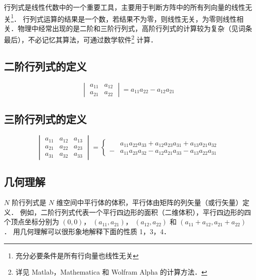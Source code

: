 

行列式是线性代数中的一个重要工具，主要用于判断方阵中的所有列向量的线性无关\footnote{充分必要条件是所有行向量也线性无关}．%
行列式运算的结果是一个数，若结果不为零，则线性无关，为零则线性相关．物理中经常出现的是二阶和三阶行列式，高阶行列式的计算较为复杂（见词条最后），不必记忆其算法，可通过数学软件\footnote{详见 Matlab，Mathematica 和 Wolfram Alpha 的计算方法．} %
计算． 

\subsection{二阶行列式的定义}
\begin{equation}\label{Deter_eq1}
\begin{vmatrix}
a_{11} & a_{12} \\
a_{21} & a_{22}
\end{vmatrix} = a_{11}a_{22} - a_{12}a_{21}
\end{equation}

\subsection{三阶行列式的定义}
\begin{equation}\label{Deter_eq2}
\begin{vmatrix}
a_{11} & a_{12} & a_{13} \\
a_{21} & a_{22} & a_{23} \\
a_{31} & a_{32} & a_{33}
\end{vmatrix}
= \left\{ \begin{aligned}
&a_{11}a_{22}a_{33} + a_{12}a_{23}a_{31} + a_{13}a_{21}a_{32} \\
- &a_{11}a_{23}a_{32} - a_{12}a_{21}a_{33} - a_{13}a_{22}a_{31}
\end{aligned} \right.
\end{equation}

\subsection{几何理解}
$N$ 阶行列式是 $N$ 维空间中平行体的体积，平行体由矩阵的列矢量（或行矢量）定义． 例如，二阶行列式代表一个平行四边形的面积（二维体积），平行四边形的四个顶点坐标分别为 $(0,0)$，  $(a_{11},a_{21})$，  $(a_{12},a_{22})$ 和 $(a_{11}+a_{12}, a_{21}+a_{22})$． 用几何理解可以很形象地解释下面的性质 1，3，4．

